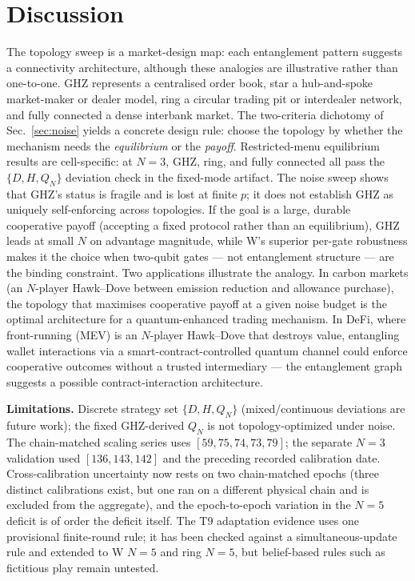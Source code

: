 \documentclass[conference]{IEEEtran}
\begin{document}
\section{Discussion}\label{sec:discussion}

The topology sweep is a market-design map: each entanglement pattern suggests
a connectivity architecture, although these analogies are illustrative rather
than one-to-one. GHZ represents a centralised order book, star a hub-and-spoke
market-maker or dealer model, ring a circular trading pit or interdealer
network, and fully connected a dense interbank market. The two-criteria
dichotomy of Sec.~\ref{sec:noise} yields a concrete design rule: choose the
topology by whether the mechanism needs the \emph{equilibrium} or the
\emph{payoff}. Restricted-menu equilibrium results are cell-specific: at
$N{=}3$, GHZ, ring, and fully connected all pass the $\{D,H,Q_N\}$ deviation
check in the fixed-mode artifact. The noise sweep shows that GHZ's status is
fragile and is lost at finite $p$; it does not establish GHZ as uniquely
self-enforcing across topologies. If the goal is a large, durable cooperative
payoff (accepting a fixed protocol rather than an equilibrium), GHZ leads at
small $N$ on advantage magnitude, while W's superior per-gate robustness
makes it the choice when two-qubit gates --- not entanglement structure ---
are the binding constraint. Two applications illustrate the analogy. In
carbon markets (an $N$-player Hawk--Dove between
emission reduction and allowance purchase), the topology that maximises
cooperative payoff at a given noise budget is the optimal architecture for a
quantum-enhanced trading mechanism. In DeFi, where front-running (MEV) is an
$N$-player Hawk--Dove that destroys value, entangling wallet interactions via
a smart-contract-controlled quantum channel could enforce cooperative
outcomes without a trusted intermediary --- the entanglement graph suggests
a possible contract-interaction architecture.

\textbf{Limitations.} Discrete strategy set $\{D,H,Q_N\}$ (mixed/continuous
deviations are future work); the fixed GHZ-derived $Q_N$ is not
topology-optimized under noise. The chain-matched scaling series uses
$[59,75,74,73,79]$; the separate $N{=}3$ validation used $[136,143,142]$ and the
preceding recorded calibration date. Cross-calibration uncertainty now rests on
two chain-matched epochs (three distinct calibrations exist, but one ran on a
different physical chain and is excluded from the aggregate), and the
epoch-to-epoch variation in the $N{=}5$ deficit is of order the deficit itself.
The T9 adaptation evidence uses one provisional finite-round rule; it has been
checked against a simultaneous-update rule and extended to W $N{=}5$ and ring
$N{=}5$, but belief-based rules such as fictitious play remain untested.
\end{document}
